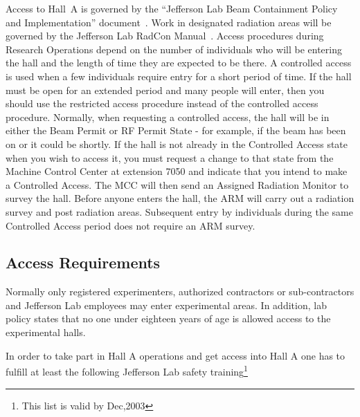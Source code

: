 Access to Hall~A is governed by the ``Jefferson Lab Beam Containment
Policy and Implementation'' document~\cite{EHScebaf6310T2}.
Work in
designated radiation areas will be governed by the Jefferson Lab
RadCon Manual~\cite{RADCONcebaf}.  Access procedures during 
Research Operations depend on
the number of individuals who will be entering the hall and the length
of time they are expected to be there.  A controlled access is used
when a few individuals require entry for a short period of time. If
the hall must be open for an extended period and many people will
enter, then you should use the restricted access procedure instead of
the controlled access procedure.  Normally, when requesting a
controlled access, the hall will be in either the Beam Permit or RF
Permit State - for example, if the beam has been on or it could be
shortly.  If the hall is not already in the Controlled Access state
when you wish to access it, you must request a change to that state
from the Machine Control Center at extension 7050 and indicate that
you intend to make a Controlled Access. The MCC will then send an
Assigned Radiation Monitor to survey the hall. Before anyone enters
the hall, the ARM will carry out a radiation survey and post radiation
areas. Subsequent entry by individuals during the same Controlled
Access period does not require an ARM survey.

\begin{safetyen}{10}{10}
\subsection{Access Requirements}
\label{sec:access-req}
\end{safetyen}

  Normally only registered experimenters, authorized contractors or
sub-contractors and Jefferson Lab employees may enter experimental
areas. 
In addition, lab policy states that no one under eighteen years
of age is allowed access to the experimental halls.

\noindent{}In order to take part in Hall A operations 
  and get access into Hall A one has to
  fulfill at least the following Jefferson Lab safety 
  training\footnote{This list is valid by Dec,2003}%

